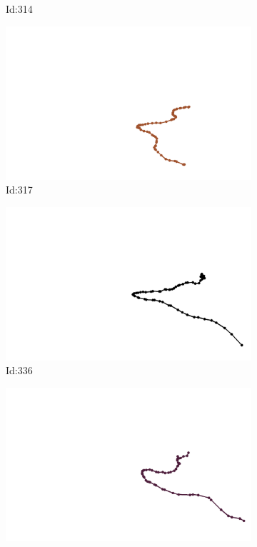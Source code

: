 \documentclass[12pt,twoside]{report}
\begin{document}
\begin{figure}
\begin{subfigure}[b]{0.20\textwidth}
\caption{Id:314}
\end{subfigure}
\begin{subfigure}[b]{0.20\textwidth}
\centering
\includegraphics[width=\textwidth]{../trajectories/317.png}
\caption{Id:317}
\end{subfigure}
\begin{subfigure}[b]{0.20\textwidth}
\centering
\includegraphics[width=\textwidth]{../trajectories/336.png}
\caption{Id:336}
\end{subfigure}
\begin{subfigure}[b]{0.20\textwidth}
\centering
\includegraphics[width=\textwidth]{../trajectories/372.png}

\end{subfigure}
\end{figure}
\end{document}
